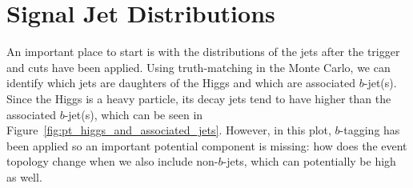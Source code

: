 \section{Signal Jet \pt Distributions}

An important place to start is with the \pt distributions of the jets after the trigger
and cuts have been applied.  Using truth-matching in the Monte Carlo, we can identify
which jets are daughters of the Higgs and which are associated $b$-jet(s).  Since
the Higgs is a heavy particle, its decay jets tend to have higher \pt than the associated
$b$-jet(s), which can be seen in Figure~\ref{fig:pt_higgs_and_associated_jets}. 
However, in this plot, $b$-tagging has been applied so an important potential
component is missing: how does the event topology change when we also include 
non-$b$-jets, which can potentially be high \pt as well.   

